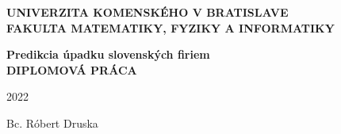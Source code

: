 \thispagestyle{empty}
\begin{center}
{\large \bf UNIVERZITA KOMENSKÉHO V BRATISLAVE \\
FAKULTA MATEMATIKY, FYZIKY A INFORMATIKY}
\end{center}
%

\vspace{2cm}
\begin{figure}[!h]
   \centering
\end{figure}

\vspace{1cm}
\begin{center}
{\large \bf Predikcia úpadku slovenských firiem \\
\vspace{3cm}
DIPLOMOVÁ PRÁCA}
\end{center}

\vfill
%
\begin{multicols}{2}
{\bf
\begin{flushleft} 2022 \end{flushleft}
\begin{flushright} Bc. Róbert Druska \end{flushright} 
}
\end{multicols}
